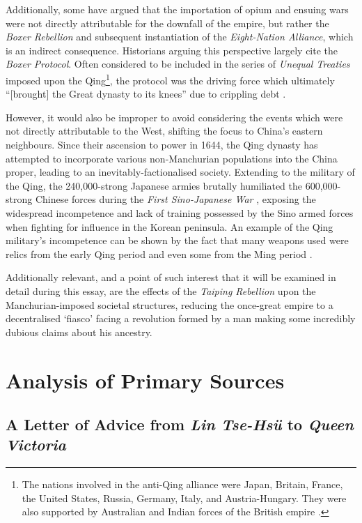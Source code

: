 \documentclass{article}
\begin{document}
        Additionally, some have argued that the importation of opium and ensuing wars were not directly attributable for the downfall of the empire, but rather the \textit{Boxer Rebellion} and subsequent instantiation of the \textit{Eight-Nation Alliance}, which is an indirect consequence. Historians arguing this perspective largely cite the \textit{Boxer Protocol}. Often considered to be included in the series of \textit{Unequal Treaties} imposed upon the Qing\footnote{The nations involved in the anti-Qing alliance were Japan, Britain, France, the United States, Russia, Germany, Italy, and Austria-Hungary. They were also supported by Australian and Indian forces of the British empire \autocite{Gardener:2016}.}, the protocol was the driving force which ultimately ``[brought] the Great dynasty to its knees'' due to crippling debt \autocite{Mitchell:2008}.

        However, it would also be improper to avoid considering the events which were not directly attributable to the West, shifting the focus to China's eastern neighbours. Since their ascension to power in 1644, the Qing dynasty has attempted to incorporate various non-Manchurian populations into the China proper, leading to an inevitably-factionalised society. Extending to the military of the Qing, the 240,000-strong Japanese armies brutally humiliated the 600,000-strong Chinese forces during the \textit{First Sino-Japanese War} \autocite{Fenby:2013}, exposing the widespread incompetence and lack of training possessed by the Sino armed forces \autocite{Jowett:2013} when fighting for influence in the Korean peninsula. An example of the Qing military's incompetence can be shown by the fact that many weapons used were relics from the early Qing period and even some from the Ming period \autocite{Qi:1964}.

        Additionally relevant, and a point of such interest that it will be examined in detail during this essay, are the effects of the \textit{Taiping Rebellion} upon the Manchurian-imposed societal structures, reducing the once-great empire to a decentralised `fiasco' facing a revolution formed by a man making some incredibly dubious claims about his ancestry.

\section{Analysis of Primary Sources}

\subsection{A Letter of Advice from \textit{Lin Tse-Hs\"u} to \textit{Queen Victoria}}
\end{document}
